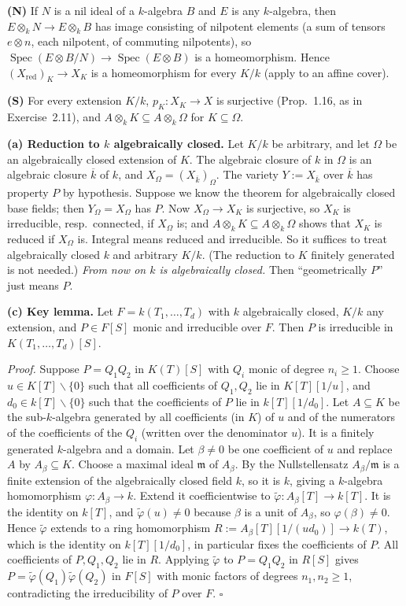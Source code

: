 \documentclass[11pt]{article}
\begin{document}
\textbf{(N)} If $N$ is a nil ideal of a $k$-algebra $B$ and $E$ is any $k$-algebra, then $E\otimes_kN\to E\otimes_kB$ has image consisting of nilpotent elements (a sum of tensors $e\otimes n$, each nilpotent, of commuting nilpotents), so $\operatorname{Spec}(E\otimes B/N)\to\operatorname{Spec}(E\otimes B)$ is a homeomorphism. Hence $(X_{\operatorname{red}})_K\to X_K$ is a homeomorphism for every $K/k$ (apply to an affine cover).

\textbf{(S)} For every extension $K/k$, $p_K:X_K\to X$ is surjective (Prop.~1.16, as in Exercise~2.11), and $A\otimes_kK\subseteq A\otimes_k\Omega$ for $K\subseteq\Omega$.

\textbf{(a) Reduction to $k$ algebraically closed.} Let $K/k$ be arbitrary, and let $\Omega$ be an algebraically closed extension of $K$. The algebraic closure of $k$ in $\Omega$ is an algebraic closure $\overline k$ of $k$, and $X_\Omega=(X_{\overline k})_\Omega$. The variety $Y:=X_{\overline k}$ over $\overline k$ has property $P$ by hypothesis. Suppose we know the theorem for algebraically closed base fields; then $Y_\Omega=X_\Omega$ has $P$. Now $X_\Omega\to X_K$ is surjective, so $X_K$ is irreducible, resp.\ connected, if $X_\Omega$ is; and $A\otimes_kK\subseteq A\otimes_k\Omega$ shows that $X_K$ is reduced if $X_\Omega$ is. Integral means reduced and irreducible. So it suffices to treat algebraically closed $k$ and arbitrary $K/k$. (The reduction to $K$ finitely generated is not needed.) \emph{From now on $k$ is algebraically closed.} Then ``geometrically $P$'' just means $P$.

\textbf{(c) Key lemma.} Let $F=k(T_1,\dots,T_d)$ with $k$ algebraically closed, $K/k$ any extension, and $P\in F[S]$ monic and irreducible over $F$. Then $P$ is irreducible in $K(T_1,\dots,T_d)[S]$.

\emph{Proof.} Suppose $P=Q_1Q_2$ in $K(T)[S]$ with $Q_i$ monic of degree $n_i\ge1$. Choose $u\in K[T]\smallsetminus\{0\}$ such that all coefficients of $Q_1,Q_2$ lie in $K[T][1/u]$, and $d_0\in k[T]\smallsetminus\{0\}$ such that the coefficients of $P$ lie in $k[T][1/d_0]$. Let $A\subseteq K$ be the sub-$k$-algebra generated by all coefficients (in $K$) of $u$ and of the numerators of the coefficients of the $Q_i$ (written over the denominator $u$). It is a finitely generated $k$-algebra and a domain. Let $\beta\ne0$ be one coefficient of $u$ and replace $A$ by $A_\beta\subseteq K$. Choose a maximal ideal $\mathfrak m$ of $A_\beta$. By the Nullstellensatz $A_\beta/\mathfrak m$ is a finite extension of the algebraically closed field $k$, so it is $k$, giving a $k$-algebra homomorphism $\varphi:A_\beta\to k$. Extend it coefficientwise to $\tilde\varphi:A_\beta[T]\to k[T]$. It is the identity on $k[T]$, and $\tilde\varphi(u)\ne0$ because $\beta$ is a unit of $A_\beta$, so $\varphi(\beta)\neq0$. Hence $\tilde\varphi$ extends to a ring homomorphism $R:=A_\beta[T][1/(ud_0)]\to k(T)$, which is the identity on $k[T][1/d_0]$, in particular fixes the coefficients of $P$. All coefficients of $P,Q_1,Q_2$ lie in $R$. Applying $\tilde\varphi$ to $P=Q_1Q_2$ in $R[S]$ gives $P=\tilde\varphi(Q_1)\tilde\varphi(Q_2)$ in $F[S]$ with monic factors of degrees $n_1,n_2\ge1$, contradicting the irreducibility of $P$ over $F$. $\square$
\end{document}

